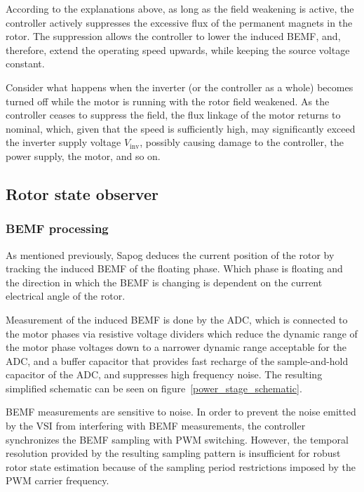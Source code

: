 \documentclass{zubaxdoc}
\begin{document}
	According to the explanations above, as long as the field weakening is active,
	the controller actively suppresses the excessive flux of the permanent magnets in the rotor.
	The suppression allows the controller to lower the induced BEMF, and, therefore,
	extend the operating speed upwards, while keeping the source voltage constant.
	
	Consider what happens when the inverter (or the controller as a whole) becomes turned off while the
	motor is running with the rotor field weakened.
	As the controller ceases to suppress the field, the flux linkage of the motor returns to nominal,
	which, given that the speed is sufficiently high, may significantly exceed the inverter supply
	voltage $V_\text{inv}$, possibly causing damage to the controller, the power supply, the motor, and so on.
	
	\subsection{Rotor state observer}
	
	\subsubsection{BEMF processing}
	
	As mentioned previously, Sapog deduces the current position of the rotor by tracking the induced BEMF
	of the floating phase.
	Which phase is floating and the direction in which the BEMF is changing is dependent on the current electrical
	angle of the rotor.
	
	Measurement of the induced BEMF is done by the ADC, which is connected to the motor phases via
	resistive voltage dividers which reduce the dynamic range of the motor phase voltages down to a narrower
	dynamic range acceptable for the ADC,
	and a buffer capacitor that provides fast recharge of the sample-and-hold capacitor of the ADC,
	and suppresses high frequency noise.
	The resulting simplified schematic can be seen on figure~\ref{power_stage_schematic}.
	
	BEMF measurements are sensitive to noise.
	In order to prevent the noise emitted by the VSI from interfering with BEMF measurements,
	the controller synchronizes the BEMF sampling with PWM switching.
	However, the temporal resolution provided by the resulting sampling pattern is insufficient for robust
	rotor state estimation because of the sampling period restrictions imposed by the
	PWM carrier frequency.
	
\end{document}
